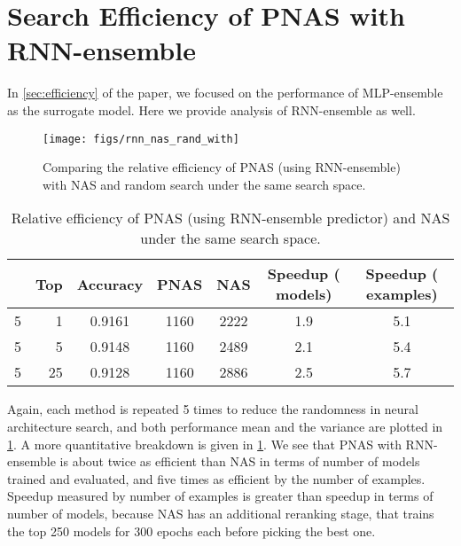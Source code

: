 \documentclass[runningheads]{llncs}
\begin{document}
\maketitle              \appendix

\section{Search Efficiency of PNAS with RNN-ensemble}

In \cref{sec:efficiency} of the paper, we focused on the performance of MLP-ensemble as the surrogate model.
Here we provide analysis of RNN-ensemble as well.

\begin{figure}[h]
\centering
\texttt{[image: figs/rnn\_nas\_rand\_with]}
\caption{Comparing the relative efficiency of PNAS (using RNN-ensemble) with NAS and random search under the same search space.}
\label{fig:efficiency-appendix}
\end{figure}

\begin{table}[H]
    \begin{center}
    \begin{tabular}{l|r|c|c|c|c|c}
    \toprule
     & Top & Accuracy & \;PNAS & \;NAS & Speedup ( models) & Speedup ( examples) \\ 
    \midrule
    5 & 1 & 0.9161 & 1160 & 2222 & 1.9 & 5.1 \\
    5 & 5 & 0.9148 & 1160 & 2489 & 2.1 & 5.4 \\
    5 & 25 & 0.9128 & 1160 & 2886 & 2.5 & 5.7 \\ 
    \bottomrule
    \end{tabular}
    \end{center}
    \caption{Relative efficiency of PNAS (using RNN-ensemble predictor) and NAS under the same search space.
}
    \label{tab:speedup-appendix}
\end{table}

Again, each method is repeated 5 times to reduce the randomness in neural architecture search, and both performance mean and the variance are plotted in \cref{fig:efficiency-appendix}.
A more quantitative breakdown is given in \cref{tab:speedup-appendix}.
We see that PNAS with RNN-ensemble is about twice as efficient than NAS in terms of number of models trained and evaluated, and five times as efficient by the number of examples.
Speedup measured by number of examples is greater than speedup in terms of number of models, because NAS has an additional reranking stage, that trains the top 250 models for 300 epochs each before picking the best one.
\end{document}
